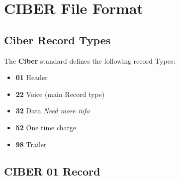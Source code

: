 \documentclass[12pt,twoside]{article}
\begin{document}
\section{CIBER File Format}
\label{sec-6}
\subsection{Ciber Record Types}
\label{sec-6-1}

   The \textbf{Ciber} standard defines the following record Types:
\begin{itemize}
\item \textbf{01} Header
\item \textbf{22} Voice (main Record type)
\item \textbf{32} Data \emph{Need more info}
\item \textbf{52} One time charge
\item \textbf{98} Trailer
\end{itemize}
\subsection{CIBER 01 Record}
\label{sec-6-2}
\end{document}
